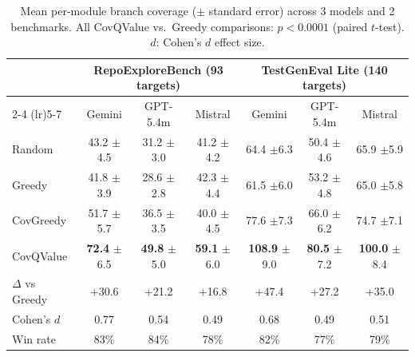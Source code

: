 \begin{table}[t]
\centering
\caption{Mean per-module branch coverage ($\pm$ standard error) across 3 models and 2 benchmarks. All CovQValue vs.\ Greedy comparisons: $p < 0.0001$ (paired $t$-test). $d$: Cohen's $d$ effect size.}
\label{tab:main}
\begin{tabular}{l ccc ccc}
\toprule
& \multicolumn{3}{c}{\textbf{RepoExploreBench} (93 targets)}& \multicolumn{3}{c}{\textbf{TestGenEval Lite} (140 targets)} \\
\cmidrule(lr){2-4} \cmidrule(lr){5-7}
& Gemini & GPT-5.4m & Mistral& Gemini & GPT-5.4m & Mistral \\
\midrule
Random & 43.2 {\tiny$\pm$4.5} & 31.2 {\tiny$\pm$3.0} & 41.2 {\tiny$\pm$4.2} & 64.4 {\tiny$\pm$6.3} & 50.4 {\tiny$\pm$4.6} & 65.9 {\tiny$\pm$5.9} \\
Greedy & 41.8 {\tiny$\pm$3.9} & 28.6 {\tiny$\pm$2.8} & 42.3 {\tiny$\pm$4.4} & 61.5 {\tiny$\pm$6.0} & 53.2 {\tiny$\pm$4.8} & 65.0 {\tiny$\pm$5.8} \\
CovGreedy & 51.7 {\tiny$\pm$5.7} & 36.5 {\tiny$\pm$3.5} & 40.0 {\tiny$\pm$4.5} & 77.6 {\tiny$\pm$7.3} & 66.0 {\tiny$\pm$6.2} & 74.7 {\tiny$\pm$7.1} \\
CovQValue & \textbf{72.4} {\tiny$\pm$6.5} & \textbf{49.8} {\tiny$\pm$5.0} & \textbf{59.1} {\tiny$\pm$6.0} & \textbf{108.9} {\tiny$\pm$9.0} & \textbf{80.5} {\tiny$\pm$7.2} & \textbf{100.0} {\tiny$\pm$8.4} \\
\midrule
$\Delta$ vs Greedy & +30.6 & +21.2 & +16.8 & +47.4 & +27.2 & +35.0 \\
Cohen's $d$ & 0.77 & 0.54 & 0.49 & 0.68 & 0.49 & 0.51 \\
Win rate & 83\% & 84\% & 78\% & 82\% & 77\% & 79\% \\
\bottomrule
\end{tabular}
\end{table}